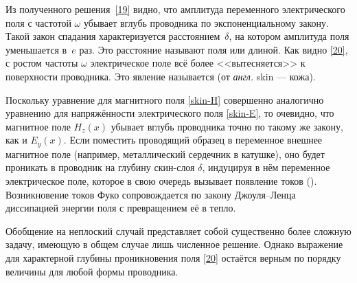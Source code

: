 Из полученного решения~\eqref{19} видно, что амплитуда переменного
электрического поля с частотой $\omega$ убывает вглубь
проводника по экспоненциальному закону. 
Такой закон спадания характеризуется расстоянием~$\delta$, 
на котором амплитуда поля уменьшается в~$e$ раз. 
Это расстояние называют  поля
или  длиной.
Как видно \eqref{20}, 
с ростом частоты $\omega$ электрическое поле всё более <<вытесняется>> 
к поверхности проводника. Это явление называется 
(от \emph{англ.} skin --- кожа). 

Поскольку уравнение для магнитного поля \eqref{skin-H} совершенно аналогично
уравнению для напряжённости электрического поля \eqref{skin-E}, то очевидно, 
что магнитное поле $H_z(x)$ убывает вглубь проводника точно по такому же закону, 
как и $E_y(x)$. Если поместить проводящий образец в переменное внешнее магнитное поле
(например, металлический сердечник в катушке),
оно будет проникать в проводник на глубину скин-слоя $\delta$, индуцируя в нём
переменное электрическое поле, которое в свою очередь 
вызывает появление токов (). Возникновение токов Фуко
сопровождается по закону Джоуля--Ленца диссипацией энергии поля с превращением
её в тепло.

Обобщение на неплоский случай представляет собой
существенно более сложную задачу, имеющую в общем случае лишь численное решение.
Однако выражение для характерной глубины проникновения поля \eqref{20} 
остаётся верным по порядку величины для любой формы проводника.

